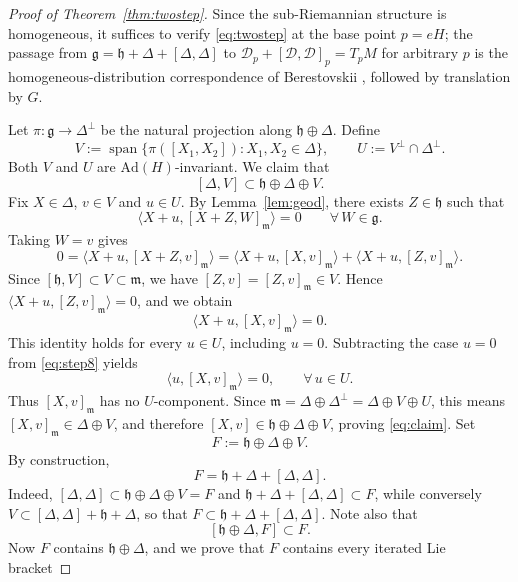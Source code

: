 \documentclass[12pt]{amsart}
\theoremstyle{plain}
\theoremstyle{definition}
\theoremstyle{remark}
\newcommand{\alg}[1]{\mathfrak{#1}}
\begin{document}
\begin{proof}[Proof of Theorem~\ref{thm:twostep}]
Since the sub-Riemannian structure is homogeneous, it suffices to verify \eqref{eq:twostep} at the
base point $p=eH$; the passage from $\alg{g}=\alg{h}+\Delta+[\Delta,\Delta]$ to
$\mathcal{D}_p+[\mathcal{D},\mathcal{D}]_p=T_pM$ for arbitrary $p$ is the
homogeneous-distribution correspondence of Berestovskii \cite{Berestovskii}, followed by
translation by $G$.

Let $\pi:\alg{g}\to\Delta^{\perp}$ be the natural projection along $\alg{h}\oplus\Delta$. Define
\[ V:=\operatorname{span}\{\pi([X_1,X_2]):X_1,X_2\in\Delta\},\qquad
U:=V^{\perp}\cap\Delta^{\perp}. \]
Both $V$ and $U$ are $\mathrm{Ad}(H)$-invariant. We claim that
\begin{equation}\label{eq:claim}
[\Delta,V]\subset\alg{h}\oplus\Delta\oplus V.
\end{equation}
Fix $X\in\Delta$, $v\in V$ and $u\in U$. By Lemma~\ref{lem:geod}, there exists $Z\in\alg{h}$ such
that
\[ \langle X+u,[X+Z,W]_{\alg{m}}\rangle=0\qquad\forall\,W\in\alg{g}. \]
Taking $W=v$ gives
\[ 0=\langle X+u,[X+Z,v]_{\alg{m}}\rangle=\langle X+u,[X,v]_{\alg{m}}\rangle
+\langle X+u,[Z,v]_{\alg{m}}\rangle. \]
Since $[\alg{h},V]\subset V\subset\alg{m}$, we have $[Z,v]=[Z,v]_{\alg{m}}\in V$. Hence
$\langle X+u,[Z,v]_{\alg{m}}\rangle=0$, and we obtain
\begin{equation}\label{eq:step8}
\langle X+u,[X,v]_{\alg{m}}\rangle=0.
\end{equation}
This identity holds for every $u\in U$, including $u=0$. Subtracting the case $u=0$ from
\eqref{eq:step8} yields
\[ \langle u,[X,v]_{\alg{m}}\rangle=0,\qquad\forall\,u\in U. \]
Thus $[X,v]_{\alg{m}}$ has no $U$-component. Since
$\alg{m}=\Delta\oplus\Delta^{\perp}=\Delta\oplus V\oplus U$, this means
$[X,v]_{\alg{m}}\in\Delta\oplus V$, and therefore $[X,v]\in\alg{h}\oplus\Delta\oplus V$, proving
\eqref{eq:claim}. Set
\[ F:=\alg{h}\oplus\Delta\oplus V. \]
By construction,
\begin{equation}\label{eq:Feq}
F=\alg{h}+\Delta+[\Delta,\Delta].
\end{equation}
Indeed, $[\Delta,\Delta]\subset\alg{h}\oplus\Delta\oplus V=F$ and
$\alg{h}+\Delta+[\Delta,\Delta]\subset F$, while conversely $V\subset[\Delta,\Delta]+\alg{h}+\Delta$,
so that $F\subset\alg{h}+\Delta+[\Delta,\Delta]$. Note also that
\begin{equation}\label{eq:Finv}
[\alg{h}\oplus\Delta,F]\subset F.
\end{equation}
Now $F$ contains $\alg{h}\oplus\Delta$, and we prove that $F$ contains every iterated Lie bracket

\end{proof}
\end{document}
